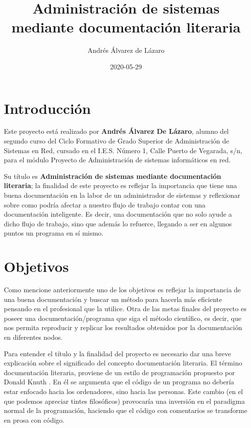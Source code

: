 \documentclass[11pt]{article}
\author{Andrés Álvarez de Lázaro}
\date{2020-05-29}
\title{Administración de sistemas \\ mediante documentación literaria}
\begin{document}
\maketitle
\newpage

\setcounter{tocdepth}{2}
\tableofcontents

\newpage

\section{Introducción}
\label{sec:org6eab725}

Este proyecto está realizado por \textbf{Andrés Álvarez De Lázaro}, alumno del segundo curso del Ciclo Formativo de Grado Superior de Administración de Sistemas en Red, cursado en el I.E.S. Número 1, Calle Puerto de Vegarada, s/n, para el módulo Proyecto de Administración de sistemas informáticos en red.

Su título es \textbf{Administración de sistemas mediante documentación literaria}; la finalidad de este proyecto es reflejar la importancia que tiene una buena documentación en la labor de un administrador de sistemas y reflexionar sobre como podría afectar a nuestro flujo de trabajo contar con una documentación inteligente. Es decir, una documentación que no solo ayude a dicho flujo de trabajo, sino que además lo refuerce, llegando a ser en algunos puntos un programa en sí mismo.

\section{Objetivos}
\label{sec:org1f27f55}

Como mencione anteriormente uno de los objetivos es reflejar la importancia de una buena documentación y buscar un método para hacerla más eficiente pensando en el profesional que la utilice. Otra de las metas finales del proyecto es poseer una documentación/programa que siga el método científico, es decir, que nos permita reproducir y replicar los resultados obtenidos por la documentación en diferentes nodos.

Para entender el título y la finalidad del proyecto es necesario dar una breve explicación sobre el significado del concepto documentación literaria. El término documentación literaria, proviene de un estilo de programación propuesto por Donald Knuth \cite{knuth1992}. En él se argumenta que el código de un programa no debería estar enfocado hacia los ordenadores, sino hacia las personas. Este cambio (en el que podemos apreciar tintes filosóficos) provocaría una inversión en el paradigma normal de la programación, haciendo que el código con comentarios se transforme en prosa con código.
\end{document}
